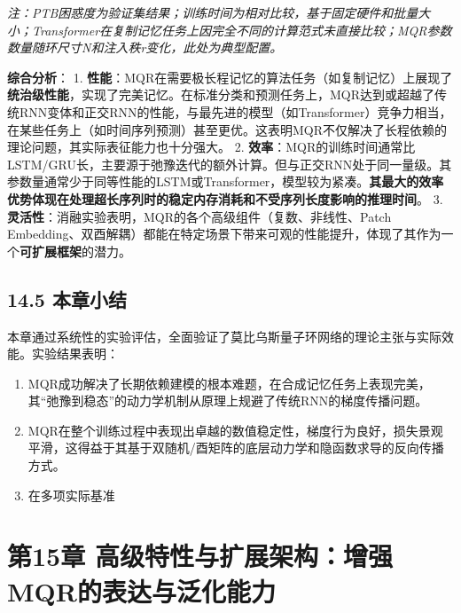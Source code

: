 \documentclass[
  12pt,
]{article}
\providecommand{\tightlist}{%
  \setlength{\itemsep}{0pt}\setlength{\parskip}{0pt}}
\begin{document}
\emph{注：PTB困惑度为验证集结果；训练时间为相对比较，基于固定硬件和批量大小；Transformer在复制记忆任务上因完全不同的计算范式未直接比较；MQR参数数量随环尺寸N和注入秩r变化，此处为典型配置。}

\textbf{综合分析}： 1.
\textbf{性能}：MQR在需要极长程记忆的算法任务（如复制记忆）上展现了\textbf{统治级性能}，实现了完美记忆。在标准分类和预测任务上，MQR达到或超越了传统RNN变体和正交RNN的性能，与最先进的模型（如Transformer）竞争力相当，在某些任务上（如时间序列预测）甚至更优。这表明MQR不仅解决了长程依赖的理论问题，其实际表征能力也十分强大。
2.
\textbf{效率}：MQR的训练时间通常比LSTM/GRU长，主要源于弛豫迭代的额外计算。但与正交RNN处于同一量级。其参数量通常少于同等性能的LSTM或Transformer，模型较为紧凑。\textbf{其最大的效率优势体现在处理超长序列时的稳定内存消耗和不受序列长度影响的推理时间}。
3. \textbf{灵活性}：消融实验表明，MQR的各个高级组件（复数、非线性、Patch
Embedding、双酉解耦）都能在特定场景下带来可观的性能提升，体现了其作为一个\textbf{可扩展框架}的潜力。

\hypertarget{ux672cux7ae0ux5c0fux7ed3-1}{%
\subsection{14.5 本章小结}\label{ux672cux7ae0ux5c0fux7ed3-1}}

本章通过系统性的实验评估，全面验证了莫比乌斯量子环网络的理论主张与实际效能。实验结果表明：

\begin{enumerate}
\def\labelenumi{\arabic{enumi}.}
\tightlist
\item
  MQR成功解决了长期依赖建模的根本难题，在合成记忆任务上表现完美，其``弛豫到稳态''的动力学机制从原理上规避了传统RNN的梯度传播问题。
\item
  MQR在整个训练过程中表现出卓越的数值稳定性，梯度行为良好，损失景观平滑，这得益于其基于双随机/酉矩阵的底层动力学和隐函数求导的反向传播方式。
\item
  在多项实际基准
\end{enumerate}

\hypertarget{ux7b2c15ux7ae0-ux9ad8ux7ea7ux7279ux6027ux4e0eux6269ux5c55ux67b6ux6784ux589eux5f3amqrux7684ux8868ux8fbeux4e0eux6cdbux5316ux80fdux529b}{%
\section{第15章
高级特性与扩展架构：增强MQR的表达与泛化能力}\label{ux7b2c15ux7ae0-ux9ad8ux7ea7ux7279ux6027ux4e0eux6269ux5c55ux67b6ux6784ux589eux5f3amqrux7684ux8868ux8fbeux4e0eux6cdbux5316ux80fdux529b}}
\end{document}
